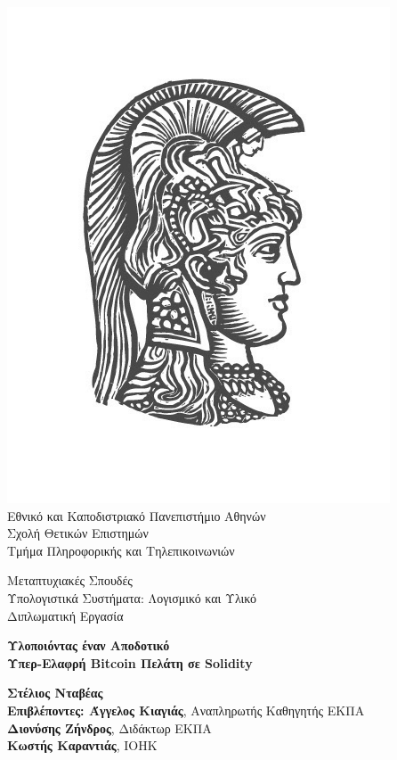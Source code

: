 \begin{center}

    \includegraphics[scale=0.8]{figures/logo_uoa.jpg}\\
    {\large Εθνικό και Καποδιστριακό Πανεπιστήμιο Αθηνών \\
    Σχολή Θετικών Επιστημών \\
    Τμήμα Πληροφορικής και Τηλεπικοινωνιών\\}
    \vspace{1cm}
    \begin{LARGE}
        Μεταπτυχιακές Σπουδές \\
        Υπολογιστικά Συστήματα: Λογισμικό και Υλικό\\
        \vspace{10mm}
        {Διπλωματική Εργασία}\\
        \vspace{0.8cm}
    \end{LARGE}
    {\textbf{\LARGE Υλοποιόντας έναν Αποδοτικό\\ Υπερ-Ελαφρή Bitcoin Πελάτη σε Solidity}}\\
    \vspace{2.5cm}


    \textbf{\large Στέλιος Νταβέας} \\
    \vspace{2.5cm}
    \textbf{\large Επιβλέποντες: Άγγελος Κιαγιάς}\large , Αναπληρωτής Καθηγητής ΕΚΠΑ\\
    \hspace{0.82cm}
    \textbf{\large Διονύσης Ζήνδρος}\large, Διδάκτωρ ΕΚΠΑ\\
    \hspace{-1.15cm}
    \textbf{\large Κωστής Καραντιάς}\large, IOHK
    \vspace{2cm}

    \date{Αθήνα, \\ Ιούνιος 2020}
    \pagebreak
\end{center}

